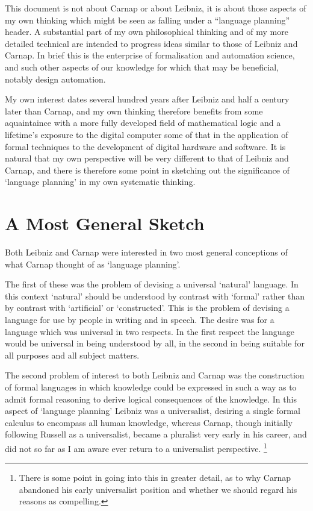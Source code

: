 \documentclass[numreferences]{rbjk}
\begin{document}
\begin{article}
This document is not about Carnap or about Leibniz, it is about those aspects of my own thinking which might be seen as falling under a ``language planning'' header.
A substantial part of my own philosophical thinking and of my more detailed technical are intended to progress ideas similar to those of Leibniz and Carnap.
In brief this is the enterprise of formalisation and automation science, and such other aspects of our knowledge for which that may be beneficial, notably design automation.

My own interest dates several hundred years after Leibniz and half a century later than Carnap, and my own thinking therefore benefits from some aquaintaince with a more fully developed field of mathematical logic and a lifetime's exposure to the digital computer some of that in the application of formal techniques to the development of digital hardware and software.
It is natural that my own perspective will be very different to that of Leibniz and Carnap, and there is therefore some point in sketching out the significance of `language planning' in my own systematic thinking.

\section{A Most General Sketch}

Both Leibniz and Carnap were interested in two most general conceptions of what Carnap thought of as `language planning'.

The first of these was the problem of devising a universal `natural' language.
In this context `natural' should be understood by contrast with `formal' rather than by contrast with `artificial' or `constructed'.
This is the problem of devising a language for use by people in writing and in speech.
The desire was for a language which was universal in two respects.
In the first respect the language would be universal in being understood by all, in the second in being suitable for all purposes and all subject matters.

The second problem of interest to both Leibniz and Carnap was the construction of formal languages in which knowledge could be expressed in such a way as to admit formal reasoning to derive logical consequences of the knowledge.
In this aspect of `language planning' Leibniz was a universalist, desiring a single formal calculus to encompass all human knowledge, whereas Carnap, though initially following Russell as a universalist, became a pluralist very early in his career, and did not so far as I am aware ever return to a universalist perspective.
\footnote{There is some point in going into this in greater detail, as to why Carnap abandoned his early universalist position and whether we should regard his reasons as compelling.}


\end{article}
\end{document}
